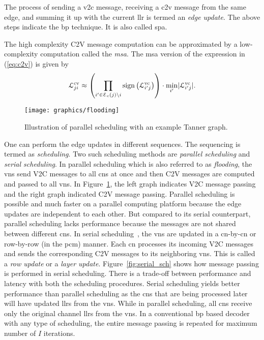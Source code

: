 The process of sending a \ac{v2c} message, receiving a \ac{c2v} message from the same edge, and summing it up with the current \ac{llr} is termed an \emph{edge update}. The above steps indicate the \ac{bp} technique. It is also called \ac{spa}.

The high complexity C2V message computation can be approximated by a low-complexity computation called the \emph{\acf{msa}}. The \ac{msa} version of the expression in (\ref{eq:c2v}) is given by
\begin{align}\label{eq:msa}
\mathcal{L}^{\mathrm{cv}}_{ji}\approx\left(\prod_{i^\prime\in\mathcal{E}_c(j)\backslash i}\operatorname{sign}\left(\mathcal{L}^{\mathrm{vc}}_{i^\prime j}\right)\right)\cdot\min_{i^\prime}\lvert\mathcal{L}^{\mathrm{vc}}_{i^\prime j}\rvert.
\end{align}

\begin{figure}[htbp]
  \centering
  \texttt{[image: graphics/flooding]}
  \caption{Illustration of parallel scheduling with an example Tanner graph.}
  \label{fig:flooding}
\end{figure}

One can perform the edge updates in different sequences. The sequencing is termed as \emph{scheduling}. Two such scheduling methods are \emph{parallel scheduling} and \emph{serial scheduling}. In parallel scheduling which is also referred to as \emph{flooding}, the \acp{vn} send V2C messages to all \acp{cn} at once and then C2V messages are computed and passed to all \acp{vn}. In Figure~\ref{fig:flooding}, the left graph indicates V2C message passing and the right graph indicated C2V message passing. Parallel scheduling is possible and much faster on a parallel computing platform because the edge updates are independent to each other. But compared to its serial counterpart, parallel scheduling lacks performance because the messages are not shared between different \acp{cn}. In serial scheduling~\cite{Zhang2002}, the \acp{vn} are updated in a \ac{cn}-by-\ac{cn} or row-by-row (in the \ac{pcm}) manner. Each \ac{cn} processes its incoming V2C messages and sends the corresponding C2V messages to its neighboring \acp{vn}. This is called a \emph{row update} or a \emph{layer update}. Figure~\ref{fig:serial_sch} shows how message passing is performed in serial scheduling. There is a trade-off between performance and latency with both the scheduling procedures. Serial scheduling yields better performance than parallel scheduling as the \acp{cn} that are being processed later will have updated \acp{llr} from the \acp{vn}. While in parallel scheduling, all \acp{cn} receive only the original channel \acp{llr} from the \acp{vn}. In a conventional \ac{bp} based decoder with any type of scheduling, the entire message passing is repeated for maximum number of $I$ iterations.

